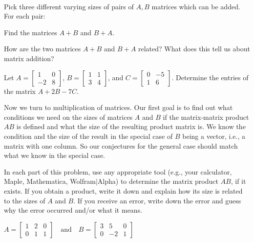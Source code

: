 \begin{pa} \label{pa:2_a} ~
\be
\item Pick three different varying sizes of pairs of $A, B$ matrices which can be added. For each pair:
	\ba
	\item Find the matrices $A+B$ and $B+A$.

	\item How are the two matrices $A+B$ and $B+A$ related? What does this tell us about matrix addition?

	\ea


\item Let $A = \left[ \begin{array}{rc} 1 & 0 \\ -2 & 8  \end{array} \right]$,  $B = \left[ \begin{array}{cc} 1 & 1 \\ 3 & 4  \end{array} \right]$, and  $C = \left[ \begin{array}{cr} 0 & -5 \\ 1 & 6  \end{array} \right]$. Determine the entries of the matrix $A + 2B - 7C$.


\item \label{p:matrix_multiplication} Now we turn to multiplication of matrices. Our first goal is to find out what conditions we need on the sizes of matrices $A$ and $B$ if the matrix-matrix product $AB$ is defined and what the size of the resulting product matrix is. We know the condition and the size of the result in the special case of $B$ being a vector, i.e., a matrix with one column. So our conjectures for the general case should match what we know in the special case.

In each part of this problem, use any appropriate tool (e.g., your calculator, Maple, Mathematica, Wolfram$|$Alpha) to determine the matrix product $AB$, if it exists. If you obtain a product, write it down and explain how its size is related to the sizes of $A$ and $B$. If you receive an error, write down the error and guess why the error occurred and/or what it means. 
	\ba
	\item $A = \left[ \begin{array}{ccc} 1&2&0 \\ 0&1&1 \end{array} \right]  \ \ \ \text{ and } \ \ \ B = \left[ \begin{array}{crc} 3&5&0\\0&-2&1 \end{array} \right]$




\end{pa}
